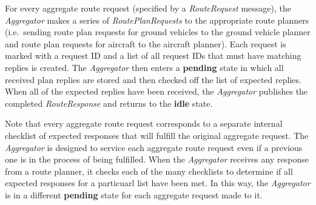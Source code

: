 For every aggregate route request (specified by a \emph{RouteRequest}
message), the \emph{Aggregator} makes a series of
\emph{RoutePlanRequests} to the appropriate route planners (i.e.~sending
route plan requests for ground vehicles to the ground vehicle planner
and route plan requests for aircraft to the aircraft planner). Each
request is marked with a request ID and a list of all request IDs that
must have matching replies is created. The \emph{Aggregator} then enters
a \textbf{pending} state in which all received plan replies are stored
and then checked off the list of expected replies. When all of the
expected replies have been received, the \emph{Aggregator} publishes the
completed \emph{RouteResponse} and returns to the \textbf{idle} state.

Note that every aggregate route request corresponds to a separate
internal checklist of expected responses that will fulfill the original
aggregate request. The \emph{Aggregator} is designed to service each
aggregate route request even if a previous one is in the process of
being fulfilled. When the \emph{Aggregator} receives any response from a
route planner, it checks each of the many checklists to determine if all
expected responses for a particuarl list have been met. In this way, the
\emph{Aggregator} is in a different \textbf{pending} state for each
aggregate request made to it.

